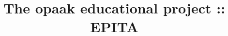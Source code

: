 %
%
%
%
%
%

%
%

%
%

\def\path{../..}

%
%



%
%


%
%

\title{The opaak educational project :: EPITA
       \version}

%
%



%
%

\maketitle

%
%

